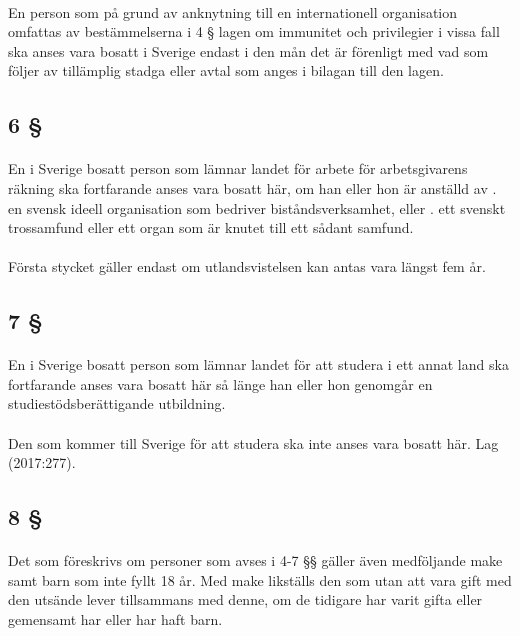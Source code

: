 \documentclass[a4paper,notitlepage,openany,10pt]{book}
\begin{document}
\paragraph*{}
En person som på grund av anknytning till en internationell organisation omfattas av bestämmelserna i 4 § lagen om immunitet och privilegier i vissa fall ska anses vara bosatt i Sverige endast i den mån det är förenligt med vad som följer av tillämplig stadga eller avtal som anges i bilagan till den lagen.
\subsection*{6 §}
\paragraph*{}
En i Sverige bosatt person som lämnar landet för arbete för arbetsgivarens räkning ska fortfarande anses vara bosatt här, om han eller hon är anställd av
. en svensk ideell organisation som bedriver biståndsverksamhet, eller
. ett svenskt trossamfund eller ett organ som är knutet till ett sådant samfund.
\paragraph*{}
Första stycket gäller endast om utlandsvistelsen kan antas vara längst fem år.
\subsection*{7 §}
\paragraph*{}
En i Sverige bosatt person som lämnar landet för att studera i ett annat land ska fortfarande anses vara bosatt här så länge han eller hon genomgår en studiestödsberättigande utbildning.
\paragraph*{}
Den som kommer till Sverige för att studera ska inte anses vara bosatt här.
Lag (2017:277).
\subsection*{8 §}
\paragraph*{}
Det som föreskrivs om personer som avses i 4-7 §§ gäller även medföljande make samt barn som inte fyllt 18 år. Med make likställs den som utan att vara gift med den utsände lever tillsammans med denne, om de tidigare har varit gifta eller gemensamt har eller har haft barn.
\end{document}
